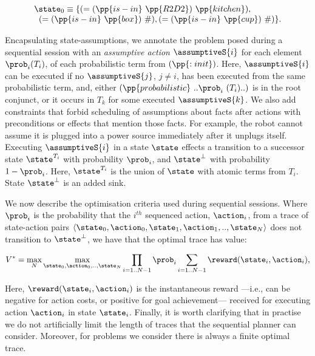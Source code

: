 \vspace{-1ex}

\small
\[
\begin{array}{l}
\state_0 \equiv \{(=(\pp{is-in}~\pp{R2D2})~\pp{kitchen}),\\
\;\;(=(\pp{is-in}~\pp{box})~\#), (=(\pp{is-in}~\pp{cup})~\#)\}.
\end{array}
\]
\normalsize

\vspace{-1ex}

Encapsulating state-assumptions, we annotate the problem posed during
a sequential session with an \emph{assumptive action} $\assumptiveS{i}$ for
each element $\prob_i (T_i)$, of each probabilistic term from
$(\pp{:init})$. Here, $\assumptiveS{i}$ can be executed if no
$\assumptiveS{j}$, $j \neq i$, has been executed from the same
probabilistic term, and, either
$(\pp{probabilistic}~..\prob_i~(T_i)..)$ is in the root conjunct, or
it occurs in $T_k$ for some executed $\assumptiveS{k}$.
We also add constraints that forbid scheduling of
assumptions about facts after actions with preconditions or effects
that mention those facts. For example, the robot cannot assume it is
plugged into a power source immediately after it unplugs itself.
Executing $\assumptiveS{i}$ in a state $\state$ effects a transition
to a successor state $\state^{T_i}$ with probability $\prob_i$, and
$\state^\bot$ with probability $1 - \prob_i$. Here, $\state^{T_i}$ is
the union of $\state$ with atomic terms from $T_i$. State
$\state^\bot$ is an added sink.


We now describe the optimisation criteria used during sequential
sessions. Where $\prob_i$ is the probability that the $i^{th}$
sequenced action, $\action_i$, from a trace of state-action pairs
$\langle \state_0, \action_0,\state_1, \action_1,.., \state_N \rangle$
does not transition to $\state^\bot$, we have that the optimal trace
has value:

\small
\[
V^* = \max_N \max_{\state_0, \action_0,.., \state_N} \prod_{i=1..N-1} \prob_i \sum_{i=1..N-1}
\reward(\state_i, \action_i),
\]
\normalsize

\noindent  Here,  $\reward(\state_i, \action_i)$ is the instantaneous
reward ---i.e., can be negative for action costs, or positive for goal
achievement--- received for executing action $\action_i$ in state
$\state_i$. Finally, it is worth clarifying that in practise we do not
artificially limit the length of traces that the sequential planner
can consider. Moreover, for problems we consider there is always a
finite optimal trace.

